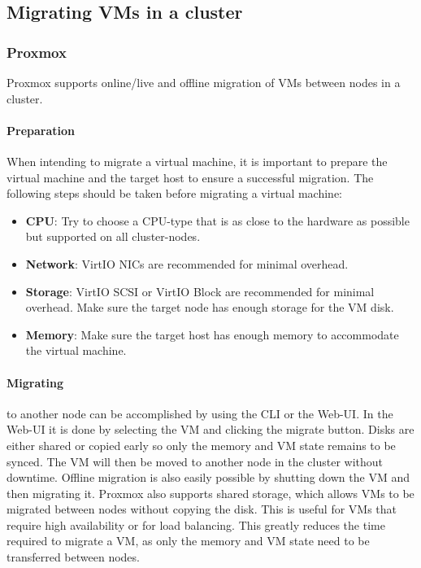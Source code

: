 \subsection{Migrating VMs in a cluster}

\subsubsection{Proxmox}
Proxmox supports online/live and offline migration of VMs between nodes in a cluster. 
\paragraph{Preparation} When intending to migrate a virtual machine, it is important to prepare the virtual machine and the target host to ensure a successful migration. The following steps should be taken before migrating a virtual machine:
\begin{itemize}
    \item \textbf{CPU}: Try to choose a CPU-type that is as close to the hardware as possible but supported on all cluster-nodes.
    \item \textbf{Network}: VirtIO NICs are recommended for minimal overhead.
    \item \textbf{Storage}: VirtIO SCSI or VirtIO Block are recommended for minimal overhead. Make sure the target node has enough storage for the VM disk.
    \item \textbf{Memory}: Make sure the target host has enough memory to accommodate the virtual machine.
\end{itemize}

\paragraph{Migrating} to another node can be accomplished by using the CLI or the Web-UI. In the Web-UI it is done by selecting the VM and clicking the migrate button. Disks are either shared or copied early so only the memory and VM state remains to be synced. The VM will then be moved to another node in the cluster without downtime. Offline migration is also easily possible by shutting down the VM and then migrating it.\newline
Proxmox also supports shared storage, which allows VMs to be migrated between nodes without copying the disk. This is useful for VMs that require high availability or for load balancing. This greatly reduces the time required to migrate a VM, as only the memory and VM state need to be transferred between nodes.


